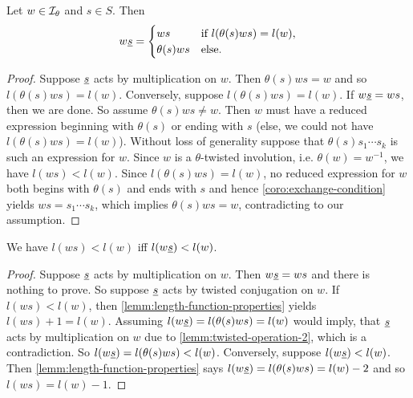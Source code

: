 \begin{lemm}
	Let $w \in \mathcal{I}_{\theta}$ and $s \in S$. Then
	$$ w \underline{s} = \begin{cases}
		ws & \textrm{if } l(\theta(s)ws) = l(w), \\
		\theta(s)ws & \textrm{else}. \\
	\end{cases} $$

	\begin{proof}
		Suppose $\underline{s}$ acts by multiplication on $w$. Then $\theta(s)ws = w$ and so $l(\theta(s)ws) = l(w)$. Conversely, suppose $l(\theta(s)ws) = l(w)$. If $w \underline{s} = ws$, then we are done. So assume $\theta(s)ws \neq w$. Then $w$ must have a reduced expression beginning with $\theta(s)$ or ending with $s$ (else, we could not have $l(\theta(s)ws) = l(w)$). Without loss of generality suppose that $\theta(s)s_1 \cdots s_k$ is such an expression for $w$. Since $w$ is a $\theta$-twisted involution, i.e. $\theta(w) = w^{-1}$, we have $l(ws) < l(w)$. Since $l(\theta(s)ws) = l(w)$, no reduced expression for $w$ both begins with $\theta(s)$ and ends with $s$ and hence \ref{coro:exchange-condition} yields $ws = s_1 \cdots s_k$, which implies $\theta(s)ws = w$, contradicting to our assumption.
	\end{proof}
\end{lemm}

\begin{lemm}
	We have $l(ws) < l(w)$ iff $l(w \underline{s}) < l(w)$.

	\begin{proof}
		Suppose $\underline{s}$ acts by multiplication on $w$. Then $w \underline{s} = ws$ and there is nothing to prove. So suppose $\underline{s}$ acts by twisted conjugation on $w$. If $l(ws) < l(w)$, then \ref{lemm:length-function-properties} yields $l(ws) + 1 = l(w)$. Assuming $l(w \underline{s}) = l(\theta(s)ws) = l(w)$ would imply, that $\underline{s}$ acts by multiplication on $w$ due to \ref{lemm:twisted-operation-2}, which is a contradiction. So $l(w \underline{s}) = l(\theta(s)ws) < l(w)$. Conversely, suppose $l(w \underline{s}) < l(w)$. Then \ref{lemm:length-function-properties} says $l(w \underline{s}) = l(\theta(s)ws) = l(w) - 2$ and so $l(ws) = l(w) - 1$.
	\end{proof}
\end{lemm}

